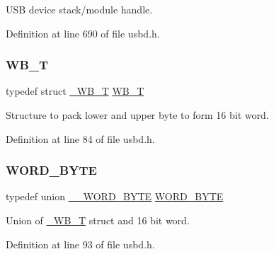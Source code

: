 U\+SB device stack/module handle. 

Definition at line 690 of file usbd.\+h.

\mbox{\label{group___u_s_b_d___core_ga4fbe30f5ac133f5bb15c653a19162ae9}} 
\subsubsection{\texorpdfstring{W\+B\+\_\+T}{WB\_T}}
{\footnotesize\ttfamily typedef struct \hyperlink{struct___w_b___t}{\+\_\+\+W\+B\+\_\+T} \hyperlink{group___u_s_b_d___core_ga4fbe30f5ac133f5bb15c653a19162ae9}{W\+B\+\_\+T}}

Structure to pack lower and upper byte to form 16 bit word. 

Definition at line 84 of file usbd.\+h.

\mbox{\label{group___u_s_b_d___core_ga340ec8de2973608b96d5cc7379b9561a}} 
\subsubsection{\texorpdfstring{W\+O\+R\+D\+\_\+\+B\+Y\+TE}{WORD\_BYTE}}
{\footnotesize\ttfamily typedef union \hyperlink{union_____w_o_r_d___b_y_t_e}{\+\_\+\+\_\+\+W\+O\+R\+D\+\_\+\+B\+Y\+TE} \hyperlink{group___u_s_b_d___core_ga340ec8de2973608b96d5cc7379b9561a}{W\+O\+R\+D\+\_\+\+B\+Y\+TE}}

Union of \hyperlink{struct___w_b___t}{\+\_\+\+W\+B\+\_\+T} struct and 16 bit word. 

Definition at line 93 of file usbd.\+h.

